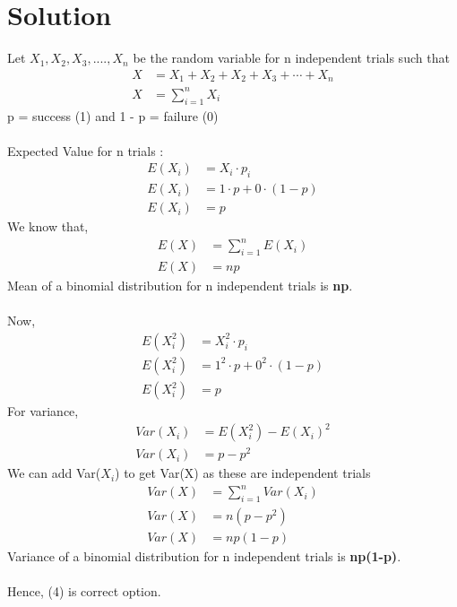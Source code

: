 \documentclass[journal,12pt,two column]{IEEEtran}
\begin{document}
\section*{\large\textbf{Solution}}
Let $X_1,X_2,X_3,....,X_n$ be the random variable for n independent trials such that 
\begin{align}
X &= X_1 + X_2 + X_2 + X_3 + \cdots + X_n \nonumber \\ 
X &= \sum_{i=1}^n X_i \nonumber 
\end{align}
p = success (1) and 1 - p = failure (0) \\ \\
Expected Value for n trials : 
\begin{align}
E(X_i) &= X_i\cdot p_i \nonumber\\
E(X_i) &= 1\cdot p + 0\cdot (1-p)\nonumber\\
E(X_i) &= p
\end{align}
We know that,
\begin{align}
E(X) &= \sum_{i=1}^n E (X_i) \nonumber\\
E(X) &= np
 \end{align}
Mean of a binomial distribution for n independent trials is \textbf{np}.\\ \\
Now,
\begin{align}
E(X_i^2) &= X_i^2\cdot p_i \nonumber\\
E(X_i^2) &= 1^2\cdot p + 0^2\cdot (1-p)\nonumber\\
E(X_i^2) &= p
\end{align}
For variance,
\begin{align}
    Var(X_i) &= E(X_i^2) - E(X_i)^2 \nonumber\\
    Var(X_i) &= p - p^2 
    \end{align}
We can add Var($X_i$)  to get Var(X)  as these are independent trials
\begin{align}
Var(X) &= \sum_{i=1}^n Var(X_i) \nonumber \\
Var(X) &= n(p - p^2)\nonumber\\
Var(X) &= np(1-p)
\end{align}
Variance of a binomial distribution for n independent trials is \textbf{np(1-p)}.\\ \\
Hence, (4) is correct option.
\end{document}
